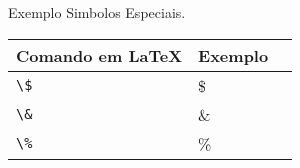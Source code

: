 \begin{quadro}[!htb]
    \centering
    \caption{Exemplo Simbolos Especiais.\label{qua:quadro-simbolos-especiais}}
        \begin{tabular}{|l|l|l|}
            \hline
                \multicolumn{1}{|c|}{\textbf{Comando em \LaTeX{}}} & \multicolumn{1}{c|}{\textbf{Exemplo}} \\ \hline
                \verb|\$|                                       & \$                                     \\ \hline
                \verb|\&|                                       & \&                                      \\ \hline
                \verb|\%|                                       & \%                                       \\ \hline
        \end{tabular}
\end{quadro}